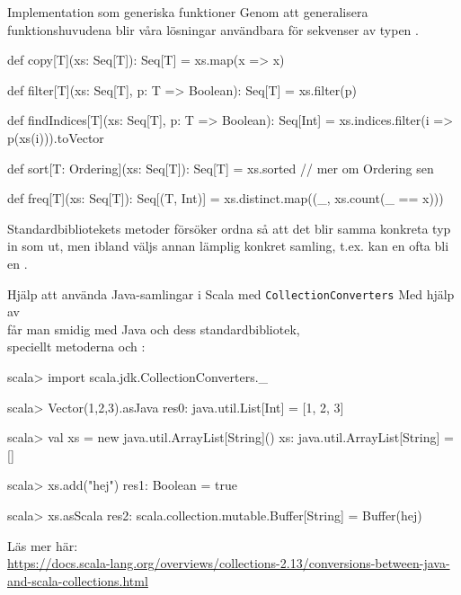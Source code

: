 \begin{Slide}{Implementation som generiska funktioner}
Genom att generalisera funktionshuvudena blir våra lösningar användbara för  sekvenser av typen .
\begin{Code}
def copy[T](xs: Seq[T]): Seq[T] = xs.map(x => x)

def filter[T](xs: Seq[T], p: T => Boolean): Seq[T] = xs.filter(p)

def findIndices[T](xs: Seq[T], p: T => Boolean): Seq[Int] =
  xs.indices.filter(i => p(xs(i))).toVector

def sort[T: Ordering](xs: Seq[T]): Seq[T] = xs.sorted // mer om Ordering sen

def freq[T](xs: Seq[T]): Seq[(T, Int)] =
  xs.distinct.map((_, xs.count(_ == x)))
\end{Code}
\pause
Standardbibliotekets metoder försöker ordna så att det blir samma konkreta typ in som ut, men ibland väljs annan lämplig konkret samling, t.ex. kan en  ofta bli en .
\end{Slide}

\begin{Slide}{Hjälp att använda Java-samlingar i Scala med \texttt{CollectionConverters}}\SlideFontSmall
Med hjälp av  \\
får man smidig  med Java och dess standardbibliotek, \\
speciellt metoderna  och :
\begin{REPL}
scala> import scala.jdk.CollectionConverters._

scala> Vector(1,2,3).asJava
res0: java.util.List[Int] = [1, 2, 3]

scala> val xs = new java.util.ArrayList[String]()
xs: java.util.ArrayList[String] = []

scala> xs.add("hej")
res1: Boolean = true

scala> xs.asScala
res2: scala.collection.mutable.Buffer[String] = Buffer(hej)
\end{REPL}

\noindent Läs mer här: %
\ifkompendium\\\fi%
\scriptsize%
\url{https://docs.scala-lang.org/overviews/collections-2.13/conversions-between-java-and-scala-collections.html}

\end{Slide}


